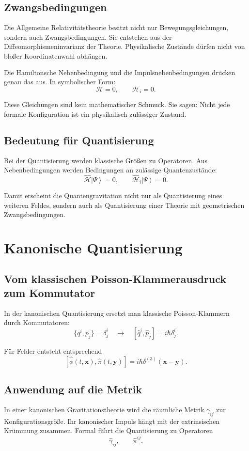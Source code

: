 \documentclass[11pt,a4paper,oneside]{book}
\theoremstyle{definition}
\theoremstyle{plain}
\theoremstyle{remark}
\newcommand{\ket}[1]{\left|#1\right\rangle}
\begin{document}
\section{Zwangsbedingungen}
Die Allgemeine Relativitätstheorie besitzt nicht nur Bewegungsgleichungen, sondern auch Zwangsbedingungen. Sie entstehen aus der Diffeomorphismeninvarianz der Theorie. Physikalische Zustände dürfen nicht von bloßer Koordinatenwahl abhängen.

Die Hamiltonsche Nebenbedingung und die Impulsnebenbedingungen drücken genau das aus. In symbolischer Form:
\[
\mathcal{H}=0,\qquad \mathcal{H}_i=0.
\]

Diese Gleichungen sind kein mathematischer Schmuck. Sie sagen: Nicht jede formale Konfiguration ist ein physikalisch zulässiger Zustand.

\section{Bedeutung für Quantisierung}
Bei der Quantisierung werden klassische Größen zu Operatoren. Aus Nebenbedingungen werden Bedingungen an zulässige Quantenzustände:
\[
\hat{\mathcal{H}}\ket{\Psi}=0,\qquad \hat{\mathcal{H}}_i\ket{\Psi}=0.
\]

Damit erscheint die Quantengravitation nicht nur als Quantisierung eines weiteren Feldes, sondern auch als Quantisierung einer Theorie mit geometrischen Zwangsbedingungen.

\chapter{Kanonische Quantisierung}
\section{Vom klassischen Poisson-Klammerausdruck zum Kommutator}
In der kanonischen Quantisierung ersetzt man klassische Poisson-Klammern durch Kommutatoren:
\[
\{q^i,p_j\}=\delta^i_j
\quad\longrightarrow\quad
[\hat q^i,\hat p_j]=i\hbar\delta^i_j.
\]

Für Felder entsteht entsprechend
\[
[\hat\phi(t,\mathbf{x}),\hat\pi(t,\mathbf{y})]=i\hbar\delta^{(3)}(\mathbf{x}-\mathbf{y}).
\]

\section{Anwendung auf die Metrik}
In einer kanonischen Gravitationstheorie wird die räumliche Metrik $\gamma_{ij}$ zur Konfigurationsgröße. Ihr kanonischer Impuls hängt mit der extrinsischen Krümmung zusammen. Formal führt die Quantisierung zu Operatoren
\[
\hat\gamma_{ij},\qquad \hat\pi^{ij}.
\]
\end{document}
